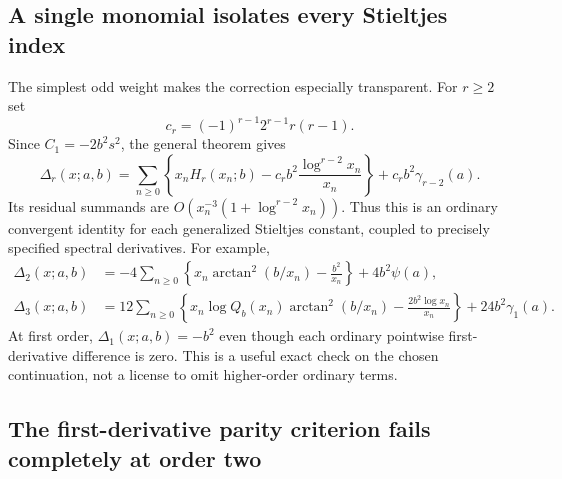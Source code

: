 \documentclass[11pt,a4paper]{article}
\numberwithin{equation}{section}
\theoremstyle{definition}
\theoremstyle{remark}
\begin{document}
\subsection{A single monomial isolates every Stieltjes index}

The simplest odd weight makes the correction especially transparent.
For $r\ge2$ set
\[
 c_r=(-1)^{r-1}2^{r-1}r(r-1).
\]
Since $C_1=-2b^2s^2$, the general theorem gives
\begin{equation}\label{sd:eq:linear-weight}
 \boxed{\displaystyle
 \Delta_r(x;a,b)=
 \sum_{n\ge0}\left\{x_nH_r(x_n;b)
       -c_rb^2\frac{\log^{r-2}x_n}{x_n}\right\}
       +c_rb^2\gamma_{r-2}(a).}
\end{equation}
Its residual summands are
$O(x_n^{-3}(1+\log^{r-2}x_n))$.  Thus this is an ordinary convergent
identity for each generalized Stieltjes constant, coupled to precisely
specified spectral derivatives.  For example,
\begin{align}
 \Delta_2(x;a,b)
 &=-4\sum_{n\ge0}
       \left\{x_n\arctan^2(b/x_n)-\frac{b^2}{x_n}\right\}
       +4b^2\psi(a),\label{sd:eq:linear-second}\\
 \Delta_3(x;a,b)
 &=12\sum_{n\ge0}
       \left\{x_n\log Q_b(x_n)\arctan^2(b/x_n)
                      -\frac{2b^2\log x_n}{x_n}\right\}
       +24b^2\gamma_1(a).\label{sd:eq:linear-third}
\end{align}
At first order, $\Delta_1(x;a,b)=-b^2$ even though each ordinary
pointwise first-derivative difference is zero.  This is a useful exact
check on the chosen continuation, not a license to omit higher-order
ordinary terms.

\subsection{The first-derivative parity criterion fails completely at order two}
\end{document}
